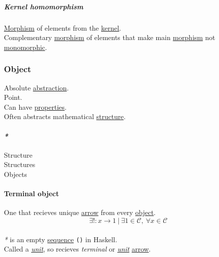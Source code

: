 \documentclass[11pt]{article}
\begin{document}
\subparagraph{\label{orgfe13a22}Kernel homomorphism}
\label{sec:org5abb7f1}
\hyperref[orgad99fc6]{Morphism} of elements from the \hyperref[orge7061fe]{kernel}.\\
Complementary \hyperref[orgad99fc6]{morphism} of elements that make main \hyperref[orgad99fc6]{morphism} not \hyperref[orga9f7512]{monomorphic}.\\

\subsubsection{\label{org025aac8}Object}
\label{sec:org31f27f9}
Absolute \hyperref[orgd787547]{abstraction}.\\

Point.\\

Can have \hyperref[org763ad6b]{properties}.\\

Often abstracts mathematical \hyperref[org93ee82c]{structure}.\\

\paragraph{\emph{*}}
\label{sec:orgfdbb352}

\label{org93ee82c}Structure\\
\label{org51d1eff}Structures\\
\label{orge0f000f}Objects\\

\paragraph{\label{org05f2dea}Terminal object}
\label{sec:org4f78f5d}
One that recieves unique \hyperref[org5b6e6e9]{arrow} from every \hyperref[org025aac8]{object}.\\

$$ \exists ! : x \to 1 \ | \ \exists 1 \in \mathcal{C}, \ \forall x \in \mathcal{C}$$\\

\emph{*} is an empty \hyperref[orgf90a45c]{sequence} \texttt{()} in Haskell.\\

Called a \emph{\hyperref[org2833f3f]{unit}}, so recieves \emph{terminal} or \emph{\hyperref[org2833f3f]{unit}} \hyperref[org5b6e6e9]{arrow}.\\
\end{document}
